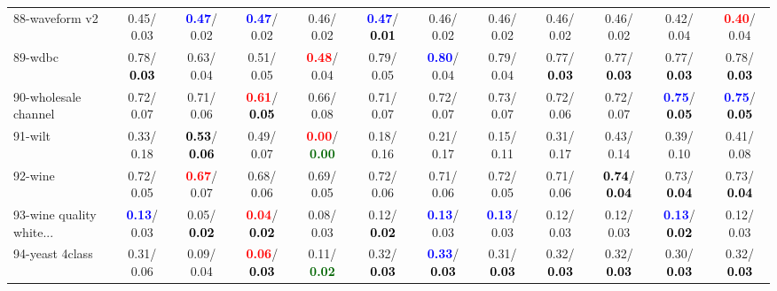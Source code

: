 \begin{table}[h]
\begin{center}
{\begin{tabular}{lc|c|c|c|c|c|c|c|c|c|c}
88-waveform v2 &   0.45/  0.03 & \textcolor{blue}{\textbf{  0.47}}/  0.02 & \textcolor{blue}{\textbf{  0.47}}/  0.02 &   0.46/  0.02 & \textcolor{blue}{\textbf{  0.47}}/\textcolor{black}{\textbf{  0.01}} &   0.46/  0.02 &   0.46/  0.02 &   0.46/  0.02 &   0.46/  0.02 &   0.42/  0.04 & \textcolor{red}{\textbf{  0.40}}/  0.04 \\
89-wdbc &   0.78/\textcolor{black}{\textbf{  0.03}} &   0.63/  0.04 &   0.51/  0.05 & \textcolor{red}{\textbf{  0.48}}/  0.04 &   0.79/  0.05 & \textcolor{blue}{\textbf{  0.80}}/  0.04 &   0.79/  0.04 &   0.77/\textcolor{black}{\textbf{  0.03}} &   0.77/\textcolor{black}{\textbf{  0.03}} &   0.77/\textcolor{black}{\textbf{  0.03}} &   0.78/\textcolor{black}{\textbf{  0.03}} \\
90-wholesale channel &   0.72/  0.07 &   0.71/  0.06 & \textcolor{red}{\textbf{  0.61}}/\textcolor{black}{\textbf{  0.05}} &   0.66/  0.08 &   0.71/  0.07 &   0.72/  0.07 &   0.73/  0.07 &   0.72/  0.06 &   0.72/  0.07 & \textcolor{blue}{\textbf{  0.75}}/\textcolor{black}{\textbf{  0.05}} & \textcolor{blue}{\textbf{  0.75}}/\textcolor{black}{\textbf{  0.05}} \\
91-wilt &   0.33/  0.18 & \textcolor{black}{\textbf{  0.53}}/\textcolor{black}{\textbf{  0.06}} &   0.49/  0.07 & \textcolor{red}{\textbf{  0.00}}/\textcolor{darkgreen}{\textbf{  0.00}} &   0.18/  0.16 &   0.21/  0.17 &   0.15/  0.11 &   0.31/  0.17 &   0.43/  0.14 &   0.39/  0.10 &   0.41/  0.08 \\
92-wine &   0.72/  0.05 & \textcolor{red}{\textbf{  0.67}}/  0.07 &   0.68/  0.06 &   0.69/  0.05 &   0.72/  0.06 &   0.71/  0.06 &   0.72/  0.05 &   0.71/  0.06 & \textcolor{black}{\textbf{  0.74}}/\textcolor{black}{\textbf{  0.04}} &   0.73/\textcolor{black}{\textbf{  0.04}} &   0.73/\textcolor{black}{\textbf{  0.04}} \\ \hline
93-wine quality white... & \textcolor{blue}{\textbf{  0.13}}/  0.03 &   0.05/\textcolor{black}{\textbf{  0.02}} & \textcolor{red}{\textbf{  0.04}}/\textcolor{black}{\textbf{  0.02}} &   0.08/  0.03 &   0.12/\textcolor{black}{\textbf{  0.02}} & \textcolor{blue}{\textbf{  0.13}}/  0.03 & \textcolor{blue}{\textbf{  0.13}}/  0.03 &   0.12/  0.03 &   0.12/  0.03 & \textcolor{blue}{\textbf{  0.13}}/\textcolor{black}{\textbf{  0.02}} &   0.12/  0.03 \\
94-yeast 4class &   0.31/  0.06 &   0.09/  0.04 & \textcolor{red}{\textbf{  0.06}}/\textcolor{black}{\textbf{  0.03}} &   0.11/\textcolor{darkgreen}{\textbf{  0.02}} &   0.32/\textcolor{black}{\textbf{  0.03}} & \textcolor{blue}{\textbf{  0.33}}/\textcolor{black}{\textbf{  0.03}} &   0.31/\textcolor{black}{\textbf{  0.03}} &   0.32/\textcolor{black}{\textbf{  0.03}} &   0.32/\textcolor{black}{\textbf{  0.03}} &   0.30/\textcolor{black}{\textbf{  0.03}} &   0.32/\textcolor{black}{\textbf{  0.03}} \\\end{tabular}
}\label{strats2bC4.5w}
\end{center}
\end{table}
                                     